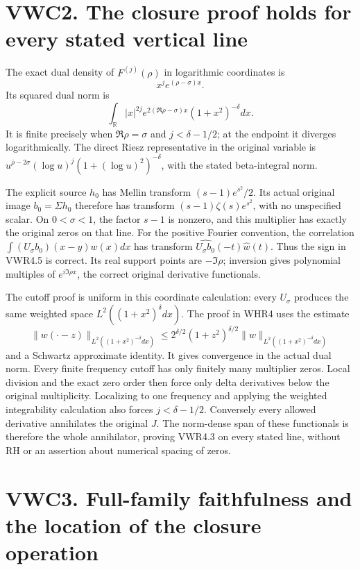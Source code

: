 \section{VWC2. The closure proof holds for every stated vertical
line}\label{vwc2.-the-closure-proof-holds-for-every-stated-vertical-line}

The exact dual density of \(F^{(j)}(\rho)\) in logarithmic coordinates
is \[
x^j e^{(\rho-\sigma)x}.
\] Its squared dual norm is \[
\int_{\mathbb R}|x|^{2j}e^{2(\Re\rho-\sigma)x}(1+x^2)^{-\delta}dx.
\] It is finite precisely when \(\Re\rho=\sigma\) and \(j<\delta-1/2\);
at the endpoint it diverges logarithmically. The direct Riesz
representative in the original variable is
\(u^{\bar\rho-2\sigma}(\log u)^j(1+(\log u)^2)^{-\delta}\), with the
stated beta-integral norm.

The explicit source \(h_0\) has Mellin transform \((s-1)e^{s^2}/2\). Its
actual original image \(b_0=\Sigma h_0\) therefore has transform
\((s-1)\zeta(s)e^{s^2}\), with no unspecified scalar. On \(0<\sigma<1\),
the factor \(s-1\) is nonzero, and this multiplier has exactly the
original zeros on that line. For the positive Fourier convention, the
correlation \(\int (U_\sigma b_0)(x-y)w(x)dx\) has transform
\(\widehat{U_\sigma b_0}(-t)\widehat w(t)\). Thus the sign in VWR4.5 is
correct. Its real support points are \(-\Im\rho\); inversion gives
polynomial multiples of \(e^{i\Im\rho x}\), the correct original
derivative functionals.

The cutoff proof is uniform in this coordinate calculation: every
\(U_\sigma\) produces the same weighted space
\(L^2((1+x^2)^\delta dx)\). The proof in WHR4 uses the estimate \[
\|w(\cdot-z)\|_{L^2((1+x^2)^{-\delta}dx)}
\leq2^{\delta/2}(1+z^2)^{\delta/2}
\|w\|_{L^2((1+x^2)^{-\delta}dx)}
\] and a Schwartz approximate identity. It gives convergence in the
actual dual norm. Every finite frequency cutoff has only finitely many
multiplier zeros. Local division and the exact zero order then force
only delta derivatives below the original multiplicity. Localizing to
one frequency and applying the weighted integrability calculation also
forces \(j<\delta-1/2\). Conversely every allowed derivative annihilates
the original \(J\). The norm-dense span of these functionals is
therefore the whole annihilator, proving VWR4.3 on every stated line,
without RH or an assertion about numerical spacing of zeros.

\section{VWC3. Full-family faithfulness and the location of the closure
operation}\label{vwc3.-full-family-faithfulness-and-the-location-of-the-closure-operation}

